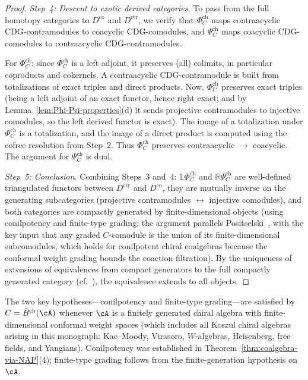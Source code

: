 \begin{proof}
\emph{Step~4: Descent to exotic derived categories.}
To pass from the full homotopy categories to $D^{\mathrm{co}}$ and
$D^{\mathrm{ctr}}$, we verify that $\Phi_C^{\mathrm{ch}}$ maps
contraacyclic CDG-contramodules to coacyclic CDG-comodules, and
$\Psi_C^{\mathrm{ch}}$ maps coacyclic CDG-comodules to
contraacyclic CDG-contramodules.

For $\Phi_C^{\mathrm{ch}}$: since $\Phi_C^{\mathrm{ch}}$ is a
left adjoint, it preserves (all) colimits, in particular coproducts
and cokernels.  A contraacyclic CDG-contramodule is built from
totalizations of exact triples and direct products.  Now,
$\Phi_C^{\mathrm{ch}}$ preserves exact triples (being a left adjoint
of an exact functor, hence right exact; and by
Lemma~\ref{lem:Phi-Psi-properties}(d) it sends projective
contramodules to injective comodules, so the left derived functor
is exact).  The image of a totalization under $\Phi_C^{\mathrm{ch}}$
is a totalization, and the image of a direct product is computed
using the cofree resolution from Step~2.  Thus
$\Phi_C^{\mathrm{ch}}$ preserves contraacyclic $\to$ coacyclic.
The argument for $\Psi_C^{\mathrm{ch}}$ is dual.

\emph{Step~5: Conclusion.}
Combining Steps~3 and~4:  $\mathbb{L}\Phi_C^{\mathrm{ch}}$ and
$\mathbb{R}\Psi_C^{\mathrm{ch}}$ are well-defined triangulated
functors between $D^{\mathrm{ctr}}$ and $D^{\mathrm{co}}$, they
are mutually inverse on the generating subcategories (projective
contramodules $\leftrightarrow$ injective comodules), and both
categories are compactly generated by finite-dimensional objects
(using conilpotency and finite-type grading; the argument parallels
Positselski~\cite[\S5.5]{Positselski11}, with the key input that any
graded $C$-comodule is the union of its finite-dimensional
subcomodules, which holds for conilpotent chiral coalgebras because
the conformal weight grading bounds the coaction filtration).
By the uniqueness of extensions of equivalences from compact generators
to the full compactly generated category
(cf.~\cite[\S5.5]{Positselski11}), the equivalence extends to all objects.
\end{proof}

\begin{remark}[Hypotheses]\label{rem:co-contra-hypotheses}
The two key hypotheses---conilpotency and finite-type grading---are
satisfied by $C = \bar{B}^{\mathrm{ch}}(\cA)$ whenever $\cA$ is a
finitely generated chiral algebra with finite-dimensional conformal
weight spaces (which includes all Koszul chiral algebras arising in
this monograph: Kac--Moody, Virasoro, $W$-algebras, Heisenberg, free
fields, and Yangians).  Conilpotency was established in
Theorem~\ref{thm:coalgebra-via-NAP}(4); finite-type grading follows
from the finite-generation hypothesis on~$\cA$.
\end{remark}

